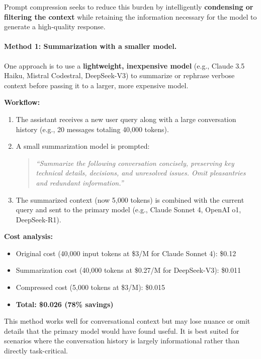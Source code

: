 \documentclass[english]{article}
\begin{document}
Prompt compression seeks to reduce this burden by intelligently \textbf{condensing or filtering the context} while retaining the information necessary for the model to generate a high-quality response.

\paragraph{Method 1: Summarization with a smaller model.}

One approach is to use a \textbf{lightweight, inexpensive model} (e.g., Claude 3.5 Haiku, Mistral Codestral, DeepSeek-V3) to summarize or rephrase verbose context before passing it to a larger, more expensive model.

\textbf{Workflow:}
\begin{enumerate}
    \item The assistant receives a new user query along with a large conversation history (e.g., 20 messages totaling 40,000 tokens).
    \item A small summarization model is prompted:
    \begin{quote}
    \textit{``Summarize the following conversation concisely, preserving key technical details, decisions, and unresolved issues. Omit pleasantries and redundant information.''}
    \end{quote}
    \item The summarized context (now 5,000 tokens) is combined with the current query and sent to the primary model (e.g., Claude Sonnet 4, OpenAI o1, DeepSeek-R1).
\end{enumerate}

\textbf{Cost analysis:}
\begin{itemize}
    \item Original cost (40,000 input tokens at \$3/M for Claude Sonnet 4): \$0.12
    \item Summarization cost (40,000 tokens at \$0.27/M for DeepSeek-V3): \$0.011
    \item Compressed cost (5,000 tokens at \$3/M): \$0.015
    \item \textbf{Total: \$0.026 (78\% savings)}
\end{itemize}

This method works well for conversational context but may lose nuance or omit details that the primary model would have found useful. It is best suited for scenarios where the conversation history is largely informational rather than directly task-critical.
\end{document}
